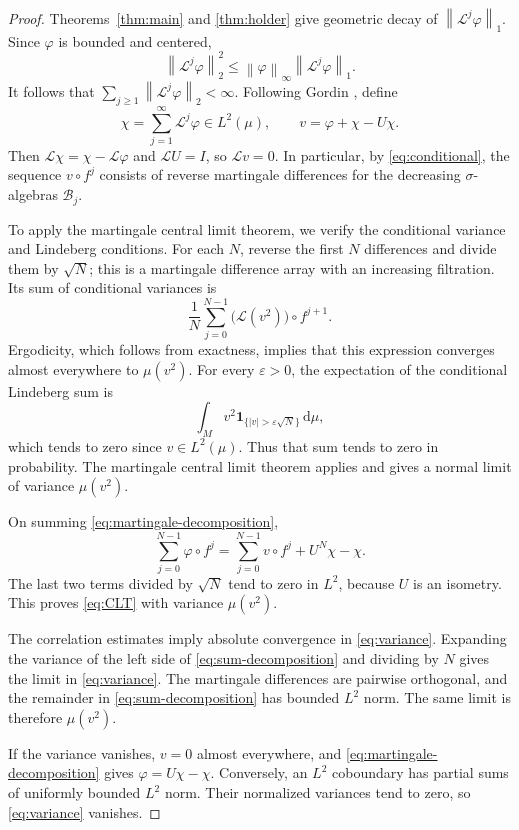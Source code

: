 \documentclass[11pt,reqno]{amsart}
\theoremstyle{plain}
\theoremstyle{definition}
\theoremstyle{remark}
\newcommand{\Lop}{\mathcal L}
\newcommand{\Bcal}{\mathcal B}
\newcommand{\norm}[1]{\left\lVert #1\right\rVert}
\newcommand{\dd}{\mathrm d}
\numberwithin{equation}{section}
\begin{document}
\begin{proof}
Theorems~\ref{thm:main} and \ref{thm:holder} give geometric decay of $\norm{\Lop^j\varphi}_1$. Since $\varphi$ is bounded and centered,
\[
 \norm{\Lop^j\varphi}_2^2
 \le\norm{\varphi}_\infty\norm{\Lop^j\varphi}_1.
\]
It follows that $\sum_{j\ge1}\norm{\Lop^j\varphi}_2<\infty$. Following Gordin \cite{Gordin69}, define
\begin{equation}\label{eq:martingale-decomposition}
 \chi=\sum_{j=1}^{\infty}\Lop^j\varphi\in L^2(\mu),
 \qquad v=\varphi+\chi-U\chi.
\end{equation}
Then $\Lop\chi=\chi-\Lop\varphi$ and $\Lop U=I$, so $\Lop v=0$. In particular, by \eqref{eq:conditional}, the sequence $v\circ f^j$ consists of reverse martingale differences for the decreasing $\sigma$-algebras $\Bcal_j$.

To apply the martingale central limit theorem, we verify the conditional variance and Lindeberg conditions. For each $N$, reverse the first $N$ differences and divide them by $\sqrt N$; this is a martingale difference array with an increasing filtration. Its sum of conditional variances is
\[
 \frac1N\sum_{j=0}^{N-1}\big(\Lop(v^2)\big)\circ f^{j+1}.
\]
Ergodicity, which follows from exactness, implies that this expression converges almost everywhere to $\mu(v^2)$. For every $\varepsilon>0$, the expectation of the conditional Lindeberg sum is
\[
 \int_M v^2\mathbf1_{\{|v|>\varepsilon\sqrt N\}}\,\dd\mu,
\]
which tends to zero since $v\in L^2(\mu)$. Thus that sum tends to zero in probability. The martingale central limit theorem \cite{Brown71} applies and gives a normal limit of variance $\mu(v^2)$.

On summing \eqref{eq:martingale-decomposition},
\begin{equation}\label{eq:sum-decomposition}
 \sum_{j=0}^{N-1}\varphi\circ f^j
 =\sum_{j=0}^{N-1}v\circ f^j+U^N\chi-\chi.
\end{equation}
The last two terms divided by $\sqrt N$ tend to zero in $L^2$, because $U$ is an isometry. This proves \eqref{eq:CLT} with variance $\mu(v^2)$.

The correlation estimates imply absolute convergence in \eqref{eq:variance}. Expanding the variance of the left side of \eqref{eq:sum-decomposition} and dividing by $N$ gives the limit in \eqref{eq:variance}. The martingale differences are pairwise orthogonal, and the remainder in \eqref{eq:sum-decomposition} has bounded $L^2$ norm. The same limit is therefore $\mu(v^2)$.

If the variance vanishes, $v=0$ almost everywhere, and \eqref{eq:martingale-decomposition} gives $\varphi=U\chi-\chi$. Conversely, an $L^2$ coboundary has partial sums of uniformly bounded $L^2$ norm. Their normalized variances tend to zero, so \eqref{eq:variance} vanishes.
\end{proof}
\end{document}
